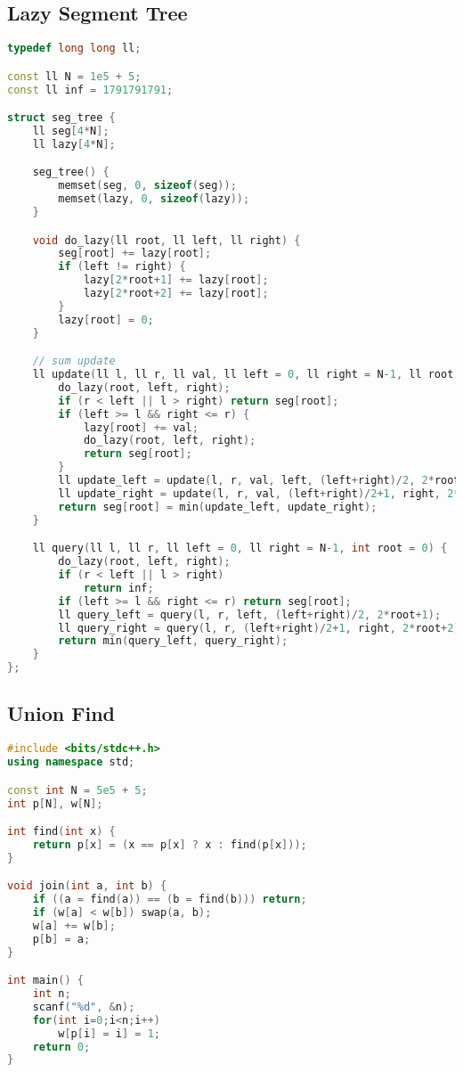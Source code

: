 \documentclass{article}
\begin{document}
\subsection{Lazy Segment Tree}
\begin{lstlisting}[language=C++]
typedef long long ll;

const ll N = 1e5 + 5;
const ll inf = 1791791791;

struct seg_tree {
	ll seg[4*N];
	ll lazy[4*N];

	seg_tree() {
		memset(seg, 0, sizeof(seg));
		memset(lazy, 0, sizeof(lazy));
	}

	void do_lazy(ll root, ll left, ll right) {
		seg[root] += lazy[root];
		if (left != right) {
			lazy[2*root+1] += lazy[root];
			lazy[2*root+2] += lazy[root];
		}
		lazy[root] = 0;
	}

	// sum update
	ll update(ll l, ll r, ll val, ll left = 0, ll right = N-1, ll root = 0) {
		do_lazy(root, left, right);
		if (r < left || l > right) return seg[root];
		if (left >= l && right <= r) {
			lazy[root] += val;
			do_lazy(root, left, right);
			return seg[root];
		}
		ll update_left = update(l, r, val, left, (left+right)/2, 2*root+1);
		ll update_right = update(l, r, val, (left+right)/2+1, right, 2*root+2);
		return seg[root] = min(update_left, update_right);
	}

	ll query(ll l, ll r, ll left = 0, ll right = N-1, int root = 0) {
		do_lazy(root, left, right);
		if (r < left || l > right)
			return inf;
		if (left >= l && right <= r) return seg[root];
		ll query_left = query(l, r, left, (left+right)/2, 2*root+1);
		ll query_right = query(l, r, (left+right)/2+1, right, 2*root+2);
		return min(query_left, query_right);
	}
};
\end{lstlisting}
\subsection{Union Find}
\begin{lstlisting}[language=C++]
#include <bits/stdc++.h>
using namespace std;

const int N = 5e5 + 5;
int p[N], w[N];

int find(int x) {
	return p[x] = (x == p[x] ? x : find(p[x]));
}

void join(int a, int b) {
	if ((a = find(a)) == (b = find(b))) return;
	if (w[a] < w[b]) swap(a, b);
	w[a] += w[b];
	p[b] = a;
}

int main() {
	int n;
	scanf("%d", &n);
	for(int i=0;i<n;i++)
		w[p[i] = i] = 1;
	return 0;
}
\end{lstlisting}
\end{document}
